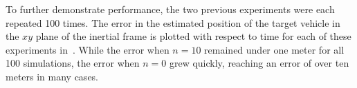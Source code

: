 

To further demonstrate performance, the two previous experiments were each
repeated 100 times.
The error in the estimated position of the target vehicle in the $xy$ plane of
the inertial frame is
plotted with respect to time for each of these experiments
in~. While the error when $n = 10$
remained under one meter for all 100 simulations, the error when $n = 0$
grew quickly, reaching an error of over ten meters in many cases.

